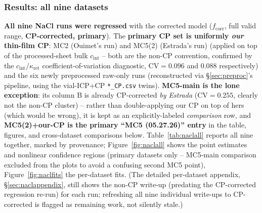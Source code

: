 \documentclass[11pt]{article}
\newcommand{\note}[1]{{\color{blue}\textsf{(#1)}}}
\newcommand{\cint}{c_{\mathrm{int}}}
\begin{document}
\subsubsection{Results: all nine datasets}\label{sec:naclAllResults}
\textbf{All nine NaCl runs were regressed} with the corrected model
($f_{\text{corr}}$, full valid range, \textbf{CP-corrected, primary}). The
\textbf{primary CP set is uniformly \emph{our} thin-film CP}: MC2 (Ouimet's
run) and MC5(2) (Estrada's run)
(applied on top of the processed-sheet bulk $\cint$ -- both are the non-CP
convention,
confirmed by the $\cint/\kappa_{\mathrm{ret}}$ coefficient-of-variation
diagnostic, CV$=0.096$ and $0.088$ respectively) and the six newly preprocessed
raw-only runs (reconstructed via \S\ref{sec:preproc}'s pipeline, using the
vial-ICP+CP \texttt{*\_CP.csv} twins). \textbf{MC5-main is the lone
exception}: its column B is already CP-corrected \emph{by Estrada}
(CV$=0.255$, clearly not the non-CP cluster) -- rather than double-applying our
CP on top of hers (which would be wrong), it is kept as an
explicitly-labeled \emph{comparison} row, and \textbf{MC5(2)+our-CP is the
primary ``MC5 (05.27.26)'' entry} in the table, figures, and cross-dataset
comparisons below. Table~\ref{tab:naclall} reports all nine together, marked by
provenance; Figure~\ref{fig:naclall} shows the point estimates and nonlinear
confidence regions (primary datasets only -- MC5-main comparison excluded from
the plots to avoid a confusing second MC5 point), Figure~\ref{fig:naclfits} the
per-dataset fits. \note{The detailed per-dataset appendix,
\S\ref{sec:naclappendix}, still shows the non-CP write-up (predating the
CP-corrected regression re-run) for each
run; refreshing all nine individual write-ups to CP-corrected is flagged as
remaining work, not silently stale.}
\end{document}
